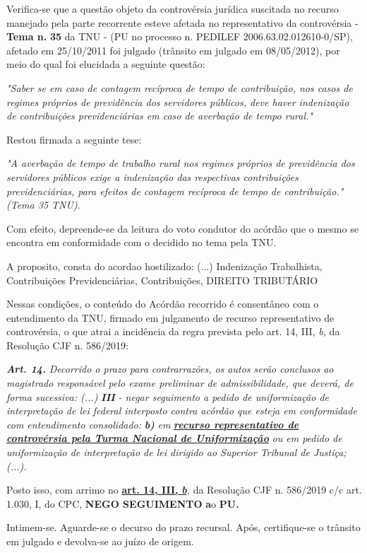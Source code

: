 \documentclass[12pt]{article}
\begin{document}
\justifying
\noindent Verifica-se que a questão objeto da controvérsia jurídica suscitada no recurso manejado pela parte recorrente esteve afetada no representativo da controvérsia - \textbf{Tema n. }\textbf{35} da TNU - (PU no processo n. PEDILEF 2006.63.02.012610-0/SP),  afetado em 25/10/2011 foi julgado (trânsito em julgado em 08/05/2012), por meio do qual foi elucidada a seguinte questão:

\noindent \textit{"Saber se em caso de contagem recíproca de tempo de contribuição, nos casos de regimes próprios de previdência dos servidores públicos, deve haver indenização de contribuições previdenciárias em caso de averbação de tempo rural."}

\noindent Restou firmada a seguinte tese:

\noindent \textit{"A averbação de tempo de trabalho rural nos regimes próprios de previdência dos servidores públicos exige a indenização das respectivas contribuições previdenciárias, para efeitos de contagem recíproca de tempo de contribuição." (Tema 35 TNU).}

\noindent Com efeito, depreende-se da leitura do voto condutor do acórdão que o mesmo se encontra em conformidade com o decidido no  tema pela TNU.

\noindent A proposito, consta do acordao hostilizado: (...) Indenização Trabalhista, Contribuições Previdenciárias, Contribuições, DIREITO TRIBUTÁRIO

\noindent Nessas condições, o conteúdo do Acórdão recorrido é consentâneo com o entendimento da TNU, firmado em julgamento de recurso representativo de controvérsia, o que atrai a incidência da regra prevista pelo art. 14, III, \textit{b,} da Resolução CJF n. 586/2019:

\noindent \textit{\textbf{Art. 14.}}\textit{ Decorrido o prazo para contrarrazões, os autos serão conclusos ao magistrado responsável pelo exame preliminar de admissibilidade, que deverá, de forma sucessiva: (...) }\textit{\textbf{III }}\textit{- negar seguimento a pedido de uniformização de interpretação de lei federal interposto contra acórdão que esteja em conformidade com entendimento consolidado: }\textit{\textbf{b)}}\textit{ em }\uline{\textit{\textbf{recurso representativo de controvérsia pela Turma Nacional de Uniformização}}}\textit{ ou em pedido de uniformização de interpretação de lei dirigido ao Superior Tribunal de Justiça;(...).}

\noindent Posto isso, com arrimo no \uline{\textbf{art. 14, III, }}\uline{\textit{\textbf{b}}}\textit{,} da Resolução CJF n. 586/2019 c/c art. 1.030, I, do CPC, \textbf{NEGO SEGUIMENTO }\textbf{a}o\textbf{ PU}\textbf{.}

\noindent Intimem-se. Aguarde-se o decurso do prazo recursal. Após, certifique-se o trânsito em julgado e devolva-se ao juízo de origem.
\end{document}
